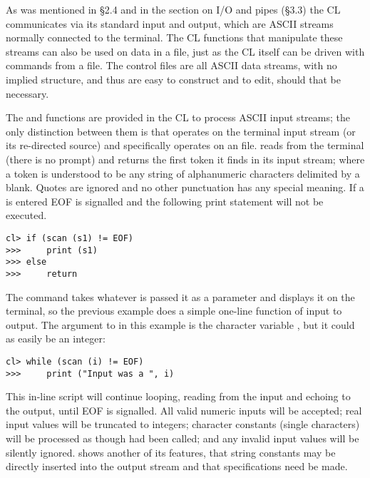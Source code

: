 As was mentioned in \S 2.4 and in the section on I/O and pipes (\S 3.3)
the CL communicates via its standard input and output,
which are ASCII streams normally connected to the terminal.  The
CL functions that manipulate these streams can also be used on
data in a file, just as the CL itself can be driven with commands 
from a file.  The control files are all ASCII
data streams, with no implied structure, and thus are easy to construct
and to edit, should that be necessary.

The  and  functions are provided 
in the CL to process ASCII input streams; 
the only distinction between them is that  operates
on the terminal input stream (or its re-directed source) and
 specifically operates on an file.   reads
from the terminal (there is no prompt) and returns the first token it
finds in its input stream; where a token is understood to be any string
of alphanumeric characters delimited by a blank.  Quotes are ignored 
and no other punctuation has any special meaning.  If a 
is entered EOF is signalled and the following 
print statement will not be executed.

\begin{verbatim}
cl> if (scan (s1) != EOF)
>>>     print (s1)
>>> else
>>>     return
\end{verbatim}

The  command takes whatever is passed it as a parameter
and displays it on the terminal, so the previous example does a simple
one-line  function of input to output.  The argument to
 in this example is the character variable , 
but it could as easily be an integer:

\begin{verbatim}
cl> while (scan (i) != EOF)
>>>     print ("Input was a ", i)
\end{verbatim}

\noindent
This in-line script will continue looping, reading from the input and
echoing to the output, until EOF is signalled.  All valid numeric inputs
will be accepted; real input values will be truncated to integers; 
character constants (single characters) will be processed as though
 had been called; and any invalid input values will
be silently ignored.   shows another of its features,
that string constants may be directly inserted into the output stream
and that  specifications need be made.

